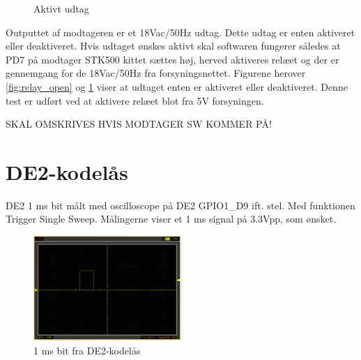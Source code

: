 \begin{figure}[htb]
\begin{minipage}{0.45\textwidth}
		\caption{Aktivt udtag}
	\label{fig:relay_closed}
  \end{minipage}
\end{figure}

Outputtet af modtageren er et 18Vac/50Hz udtag. Dette udtag er enten aktiveret eller deaktiveret. Hvis udtaget ønskes aktivt skal softwaren fungerer således at PD7 på modtager STK500 kittet sættes høj, herved aktiveres relæet og der er gennemgang for de 18Vac/50Hz fra forsyningsnettet. Figurene herover \ref{fig:relay_open} og \ref{fig:relay_closed} viser at udtaget enten er aktiveret eller deaktiveret. Denne test er udført ved at aktivere relæet blot fra 5V forsyningen.

SKAL OMSKRIVES HVIS MODTAGER SW KOMMER PÅ!

\section{DE2-kodelås}

DE2 1 ms bit målt med oscilloscope på DE2 GPIO1\_D9 ift. stel. Med funktionen Trigger Single Sweep. Målingerne viser et 1 ms signal på 3.3Vpp, som ønsket.

\begin{figure}[H]
	\centering
	\includegraphics[width=0.50\textwidth]{billeder/HWTest/DE2/DE2_1ms_pulse}
	\caption{1 ms bit fra DE2-kodelås}
	\label{code:de2_test}
\end{figure}

\clearpage